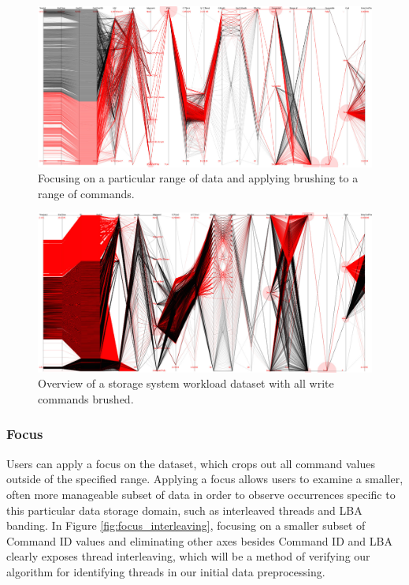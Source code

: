 \documentclass[12pt]{ucthesis}
\begin{document}
\begin{figure}[h!]
 \centering
 \includegraphics[width=\textwidth]{images/brush_focus5.pdf}
 \caption[Applying brushing to a range of commands in the dataset.]{Focusing on a particular range of data and applying brushing to a range of commands.}
 \label{fig:brush}
\end{figure}

\begin{figure}[h!]
 \centering
 \includegraphics[width=\textwidth]{images/demo.pdf}
 \caption[Storage system workload dataset with write commands brushed.]{Overview of a storage system workload dataset with all write commands brushed.}
 \label{fig:brush2}
\end{figure}

\clearpage

\subsubsection{Focus}
Users can apply a focus on the dataset, which crops out all command values outside of the specified range. Applying a focus allows users to examine a smaller, often more manageable subset of data in order to observe occurrences specific to this particular data storage domain, such as interleaved threads and LBA banding. In Figure \ref{fig:focus_interleaving}, focusing on a smaller subset of Command ID values and eliminating other axes besides Command ID and LBA clearly exposes thread interleaving, which will be a method of verifying our algorithm for identifying threads in our initial data preprocessing.
\end{document}
